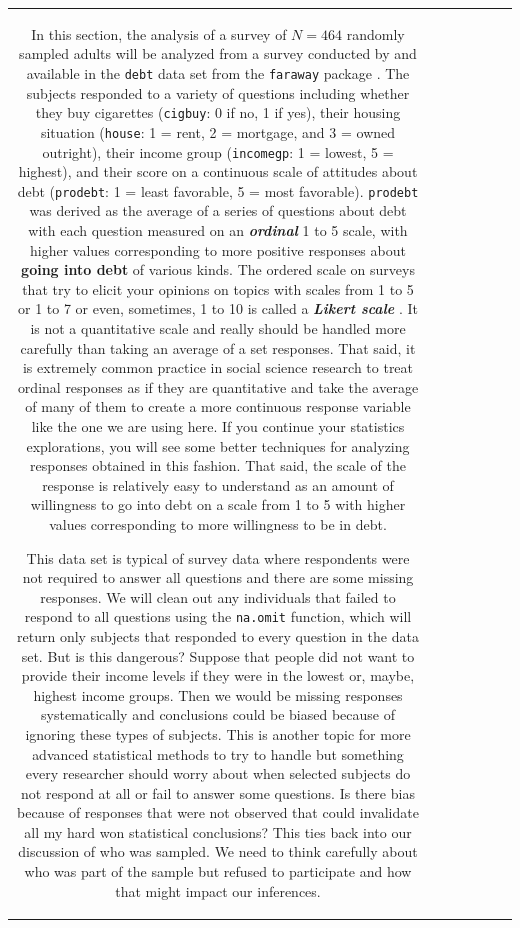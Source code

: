 \documentclass[]{book}
\newenvironment{Shaded}{\begin{snugshade}}{\end{snugshade}}
\theoremstyle{definition}
\theoremstyle{definition}
\theoremstyle{remark}
\begin{document}
\begin{longtable}[]{@{}ccccccc@{}}
\begin{minipage}[b]{0.10\columnwidth}
\begin{Shaded}
\begin{Highlighting}[]
\begin{Shaded}
\begin{Highlighting}[]
\begin{Shaded}
\begin{Highlighting}[]
In this section, the analysis of a survey of \(N=464\) randomly sampled
adults will be analyzed from a survey conducted by \citet{Lea1995} and
available in the \texttt{debt} data set from the \texttt{faraway}
package \citep{R-faraway}. The subjects responded to a variety of
questions including whether they buy cigarettes (\texttt{cigbuy}: 0 if
no, 1 if yes), their housing situation (\texttt{house}: 1 = rent, 2 =
mortgage, and 3 = owned outright), their income group
(\texttt{incomegp}: 1 = lowest, 5 = highest), and their score on a
continuous scale of attitudes about debt (\texttt{prodebt}: 1 = least
favorable, 5 = most favorable). \texttt{prodebt} was derived as the
average of a series of questions about debt with each question measured
on an \textbf{\emph{ordinal}} 1 to 5 scale, with higher values
corresponding to more positive responses about \textbf{going into debt}
of various kinds. The ordered scale on surveys that try to elicit your
opinions on topics with scales from 1 to 5 or 1 to 7 or even, sometimes,
1 to 10 is called a \textbf{\emph{Likert scale}} \citep{Likert1932}. It
is not a quantitative scale and really should be handled more carefully
than taking an average of a set responses. That said, it is extremely
common practice in social science research to treat ordinal responses as
if they are quantitative and take the average of many of them to create
a more continuous response variable like the one we are using here. If
you continue your statistics explorations, you will see some better
techniques for analyzing responses obtained in this fashion. That said,
the scale of the response is relatively easy to understand as an amount
of willingness to go into debt on a scale from 1 to 5 with higher values
corresponding to more willingness to be in debt.

This data set is typical of survey data where respondents were not
required to answer all questions and there are some missing responses.
We will clean out any individuals that failed to respond to all
questions using the \texttt{na.omit} function, which will return only
subjects that responded to every question in the data set. But is this
dangerous? Suppose that people did not want to provide their income
levels if they were in the lowest or, maybe, highest income groups. Then
we would be missing responses systematically and conclusions could be
biased because of ignoring these types of subjects. This is another
topic for more advanced statistical methods to try to handle but
something every researcher should worry about when selected subjects do
not respond at all or fail to answer some questions. Is there bias
because of responses that were not observed that could invalidate all my
hard won statistical conclusions? This ties back into our discussion of
who was sampled. We need to think carefully about who was part of the
sample but refused to participate and how that might impact our
inferences.


\end{Highlighting}
\end{Shaded}
\end{Highlighting}
\end{Shaded}
\end{Highlighting}
\end{Shaded}
\end{minipage}
\end{longtable}
\end{document}
